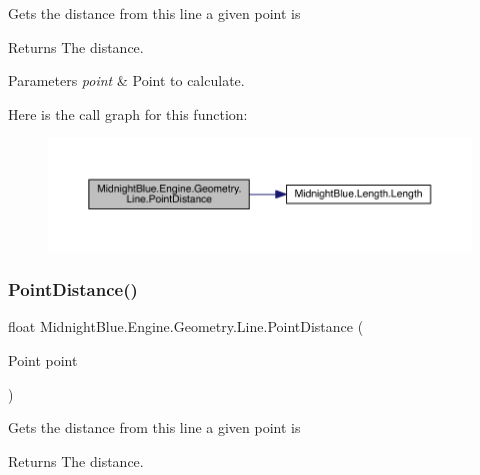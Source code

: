 Gets the distance from this line a given point is 

\begin{DoxyReturn}{Returns}
The distance.
\end{DoxyReturn}

\begin{DoxyParams}{Parameters}
{\em point} & Point to calculate.\\
\hline
\end{DoxyParams}
Here is the call graph for this function\+:
\nopagebreak
\begin{figure}[H]
\begin{center}
\leavevmode
\includegraphics[width=350pt]{class_midnight_blue_1_1_engine_1_1_geometry_1_1_line_a635a797ebd3d805977df591277a444f3_cgraph}
\end{center}
\end{figure}
\hypertarget{class_midnight_blue_1_1_engine_1_1_geometry_1_1_line_a6db10326db04557bde223029167254a8}{}\label{class_midnight_blue_1_1_engine_1_1_geometry_1_1_line_a6db10326db04557bde223029167254a8} 
\subsubsection{\texorpdfstring{Point\+Distance()}{PointDistance()}\hspace{0.1cm}{\footnotesize\ttfamily [2/2]}}
{\footnotesize\ttfamily float Midnight\+Blue.\+Engine.\+Geometry.\+Line.\+Point\+Distance (\begin{DoxyParamCaption}\item[{Point}]{point }\end{DoxyParamCaption})\hspace{0.3cm}{\ttfamily [inline]}}



Gets the distance from this line a given point is 

\begin{DoxyReturn}{Returns}
The distance.
\end{DoxyReturn}

